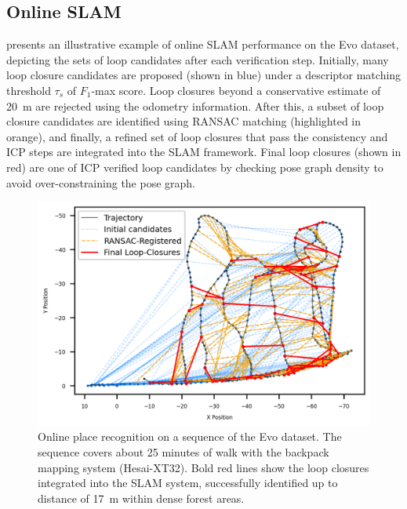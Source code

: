 \subsection{Online SLAM}
 presents an illustrative example of online SLAM performance on the Evo dataset, depicting the sets of loop candidates after each verification step. Initially, many loop closure candidates are proposed (shown in blue) under a descriptor matching threshold $\tau_{s}$ of $F_1$-max score. Loop closures beyond a conservative estimate of \SI{20}{\meter} are rejected using the odometry information. After this, a subset of loop closure candidates are identified using RANSAC matching (highlighted in orange), and finally, a refined set of loop closures that pass the consistency and ICP steps are integrated into the SLAM framework. Final loop closures (shown in red) are one of ICP verified loop candidates by checking pose graph density to avoid over-constraining the pose graph.

\begin{figure}[t]
  \centering
  \includegraphics[width=0.99\columnwidth]{pics/exp_2_1_online_place_recognition}
  \caption{Online place recognition on a sequence of the Evo dataset. The sequence covers about 25 minutes of walk with the backpack mapping system (Hesai-XT32). Bold red lines show the loop closures integrated into the SLAM system, successfully identified up to distance of \SI{17}{\meter} within dense forest areas.}
  \label{fig:exp_2_1_online_place_recognition}
\end{figure}

